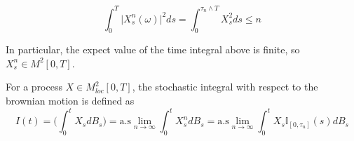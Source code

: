 \begin{equation*}
    \int_0^T \big\vert X_{s}^n(\omega) \big\vert^2 ds  = \int_0^{\tau_n \wedge T} X_s^2 ds \leq n 
\end{equation*}

In particular, the expect value of the time integral above is finite, so $X^n_s \in M^2[0,T]$. 

\begin{definition}
    For a process $X \in M^2_{loc}[0,T]$, the stochastic integral with respect to the brownian motion is defined as 
    \begin{equation*}
        I(t) = \Bigg( \int_0^t X_s dB_s \Bigg) = \text{a.s}\lim_{n \to \infty} \int_0^t X_s^n dB_s = \text{a.s}\lim_{n \to \infty} \int_0^t X_s \mathbb{I}_{[0,\tau_n]}(s) dB_s
    \end{equation*}
\end{definition}

